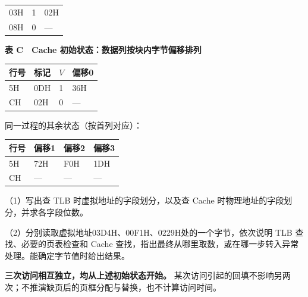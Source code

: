 \begin{example}[配套例题]
\begin{minipage}{\linewidth}
\begin{tabularx}{\linewidth}{@{}YYY@{}}
03H & 1 & 02H \\
08H & 0 & --- \\
\bottomrule\end{tabularx}
\end{minipage}\par\medskip

\textbf{表 C　Cache 初始状态：数据列按块内字节偏移排列}

\begin{wideblock}\par\medskip\noindent\begin{minipage}{\linewidth}\fontsize{9.3}{12}\selectfont\begin{tabularx}{\linewidth}{@{}YYYY@{}}
\toprule\noalign{}
行号 & 标记 & \(V\) & 偏移0 \\
\midrule\noalign{}


5H & 0DH & 1 & 36H \\
CH & 02H & 0 & --- \\
\bottomrule\end{tabularx}
\end{minipage}\par\medskip\end{wideblock}

同一过程的其余状态（按首列对应）：

\begin{wideblock}\par\medskip\noindent\begin{minipage}{\linewidth}\fontsize{9.3}{12}\selectfont\begin{tabularx}{\linewidth}{@{}YYYY@{}}
\toprule\noalign{}
行号 & 偏移1 & 偏移2 & 偏移3 \\
\midrule\noalign{}


5H & 72H & F0H & 1DH \\
CH & --- & --- & --- \\
\bottomrule\end{tabularx}
\end{minipage}\par\medskip\end{wideblock}

（1）写出查 TLB 时虚拟地址的字段划分，以及查 Cache 时物理地址的字段划分，并求各字段位数。

（2）分别读取虚拟地址03D4H、00F1H、0229H处的一个字节，依次说明 TLB 查找、必要的页表检查和 Cache 查找，指出最终从哪里取数，或在哪一步转入异常处理。能确定字节值时给出结果。

\textbf{三次访问相互独立，均从上述初始状态开始。} 某次访问引起的回填不影响另两次；不推演缺页后的页框分配与替换，也不计算访问时间。

\end{example}

